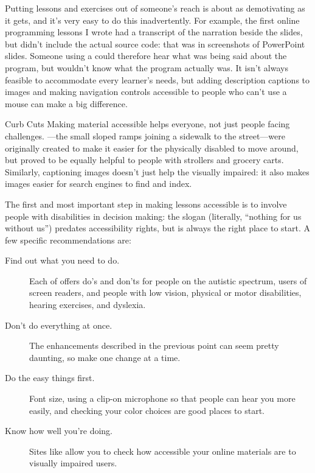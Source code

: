 
Putting lessons and exercises out of someone's reach is about as demotivating as it gets,
and it's very easy to do this inadvertently.
For example,
the first online programming lessons I wrote had a transcript of the narration
beside the slides,
but didn't include the actual source code:
that was in screenshots of PowerPoint slides.
Someone using a 
could therefore hear what was being said about the program,
but wouldn't know what the program actually was.
It isn't always feasible to accommodate every learner's needs,
but adding description captions to images
and making navigation controls accessible to people who can't use a mouse
can make a big difference.

\begin{aside}{Curb Cuts}
  Making material accessible helps everyone,
  not just people facing challenges.
  ---the small sloped ramps joining a sidewalk to the street---were
  originally created to make it easier for the physically disabled to move around,
  but proved to be equally helpful to people with strollers and grocery carts.
  Similarly,
  captioning images doesn't just help the visually impaired:
  it also makes images easier for search engines to find and index.
\end{aside}

The first and most important step in making lessons accessible is
to involve people with disabilities in decision making:
the slogan \emph{}
(literally, ``nothing for us without us'')
predates accessibility rights,
but is always the right place to start.
A few specific recommendations are:

\begin{description}

\item[Find out what you need to do.]
  Each of 
  offers do's and don'ts for people on the autistic spectrum,
  users of screen readers,
  and people with low vision,
  physical or motor disabilities,
  hearing exercises,
  and dyslexia.

\item[Don't do everything at once.]
  The enhancements described in the previous point can seem pretty daunting,
  so make one change at a time.

\item[Do the easy things first.]
  Font size,
  using a clip-on microphone so that people can hear you more easily,
  and checking your color choices are good places to start.

\item[Know how well you're doing.]
  Sites like  allow you to check
  how accessible your online materials are to visually impaired users.

\end{description}

